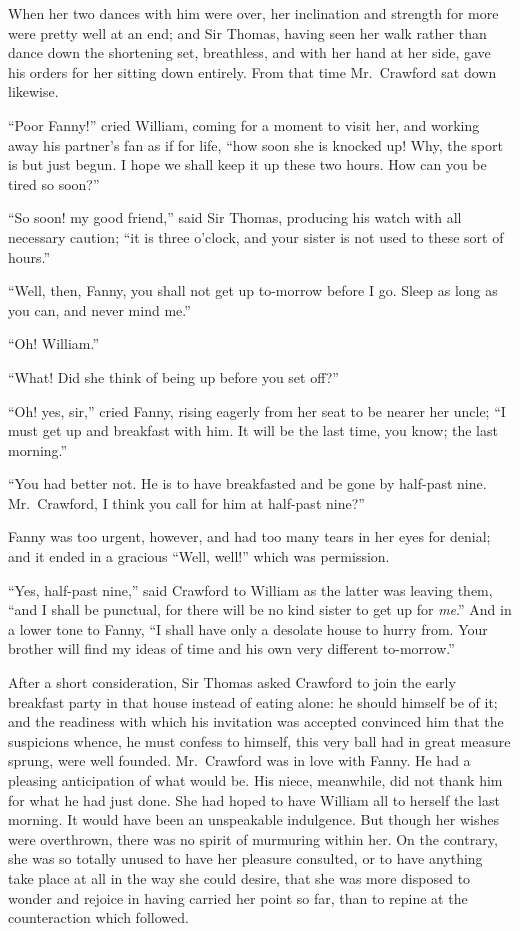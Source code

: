 \documentclass{article}
\begin{document}
When her two dances with him were over, her inclination
and strength for more were pretty well at an end;
and Sir Thomas, having seen her walk rather than dance
down the shortening set, breathless, and with her hand at
her side, gave his orders for her sitting down entirely.
From that time Mr.\ Crawford sat down likewise.

``Poor Fanny!'' cried William, coming for a moment to visit her,
and working away his partner's fan as if for life, ``how soon
she is knocked up!  Why, the sport is but just begun.
I hope we shall keep it up these two hours.  How can you
be tired so soon?''

``So soon! my good friend,'' said Sir Thomas, producing his
watch with all necessary caution; ``it is three o'clock,
and your sister is not used to these sort of hours.''

``Well, then, Fanny, you shall not get up to-morrow before
I go.  Sleep as long as you can, and never mind me.''

``Oh!  William.''

``What!  Did she think of being up before you set off?''

``Oh! yes, sir,'' cried Fanny, rising eagerly from her seat
to be nearer her uncle; ``I must get up and breakfast with him.
It will be the last time, you know; the last morning.''

``You had better not.  He is to have breakfasted and be
gone by half-past nine.  Mr.\ Crawford, I think you call
for him at half-past nine?''

Fanny was too urgent, however, and had too many tears in her
eyes for denial; and it ended in a gracious ``Well, well!''
which was permission.

``Yes, half-past nine,'' said Crawford to William as the
latter was leaving them, ``and I shall be punctual,
for there will be no kind sister to get up for \emph{me}.''
And in a lower tone to Fanny, ``I shall have only a desolate
house to hurry from.  Your brother will find my ideas
of time and his own very different to-morrow.''

After a short consideration, Sir Thomas asked Crawford
to join the early breakfast party in that house
instead of eating alone:  he should himself be of it;
and the readiness with which his invitation was accepted
convinced him that the suspicions whence, he must confess
to himself, this very ball had in great measure sprung,
were well founded.  Mr.\ Crawford was in love with Fanny.
He had a pleasing anticipation of what would be.  His niece,
meanwhile, did not thank him for what he had just done.
She had hoped to have William all to herself the last morning.
It would have been an unspeakable indulgence.  But though
her wishes were overthrown, there was no spirit of murmuring
within her.  On the contrary, she was so totally unused
to have her pleasure consulted, or to have anything take
place at all in the way she could desire, that she was more
disposed to wonder and rejoice in having carried her point
so far, than to repine at the counteraction which followed.
\end{document}
